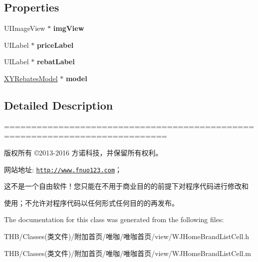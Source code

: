 \subsection*{Properties}
\begin{DoxyCompactItemize}
\item 
\mbox{\label{interface_w_j_home_brand_list_cell_af1d90b94b4b3963c181dbd18ca896c10}} 
U\+I\+Image\+View $\ast$ {\bfseries img\+View}
\item 
\mbox{\label{interface_w_j_home_brand_list_cell_a345b9159500e1fc8272c839748bcf453}} 
U\+I\+Label $\ast$ {\bfseries price\+Label}
\item 
\mbox{\label{interface_w_j_home_brand_list_cell_a7e5d4913fd5b912fa6e63c0e25ccba9d}} 
U\+I\+Label $\ast$ {\bfseries rebat\+Label}
\item 
\mbox{\label{interface_w_j_home_brand_list_cell_a4bdb891180bf4cef36ba356b676c38c6}} 
\mbox{\hyperlink{interface_x_y_rebates_model}{X\+Y\+Rebates\+Model}} $\ast$ {\bfseries model}
\end{DoxyCompactItemize}


\subsection{Detailed Description}
============================================================================

版权所有 ©2013-\/2016 方诺科技，并保留所有权利。

网站地址\+: \href{http://www.fnuo123.com}{\tt http\+://www.\+fnuo123.\+com}； 



这不是一个自由软件！您只能在不用于商业目的的前提下对程序代码进行修改和

使用；不允许对程序代码以任何形式任何目的的再发布。 

 

The documentation for this class was generated from the following files\+:\begin{DoxyCompactItemize}
\item 
T\+H\+B/\+Classes(类文件)/附加首页/唯咖/唯咖首页/view/W\+J\+Home\+Brand\+List\+Cell.\+h\item 
T\+H\+B/\+Classes(类文件)/附加首页/唯咖/唯咖首页/view/W\+J\+Home\+Brand\+List\+Cell.\+m\end{DoxyCompactItemize}
